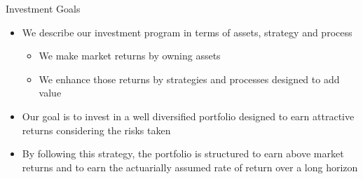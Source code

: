 \documentclass[10pt,english]{beamer}\usepackage[]{graphicx}\usepackage[]{color}
\begin{document}
\begin{frame}{Investment Goals}
\begin{itemize}
\item We describe our investment program in terms of assets, strategy and
process
\begin{itemize}
\item We make market returns by owning assets
\item We enhance those returns by strategies and processes designed to add
value
\end{itemize}
\item Our goal is to invest in a well diversified portfolio designed to
earn attractive returns considering the risks taken
\item By following this strategy, the portfolio is structured to earn above
market returns and to earn the actuarially assumed rate of return
over a long horizon 
\end{itemize}
\end{frame}
%
\end{document}
